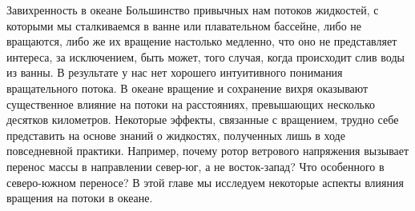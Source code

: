 
\begin{chapter}{Завихренность в океане}\label{chap:12}
Большинство привычных нам потоков жидкостей, с которыми мы сталкиваемся
в ванне или плавательном бассейне, либо не вращаются, либо же их вращение 
настолько медленно, что оно не представляет интереса, за исключением, 
быть может, того случая, когда происходит слив воды из ванны. 
В результате у нас нет хорошего интуитивного понимания вращательного потока. 
В океане вращение и сохранение вихря оказывают существенное влияние
на потоки на расстояниях, превышающих несколько десятков километров. 
Некоторые эффекты, связанные с вращением, трудно себе представить на основе
знаний о жидкостях, полученных лишь в ходе повседневной практики.
Например, почему ротор ветрового напряжения 
вызывает перенос массы в направлении север-юг, 
а не восток-запад? Что особенного в северо-южном переносе? 
В этой главе мы исследуем некоторые аспекты влияния вращения на потоки 
в океане.
%


\end{chapter}

